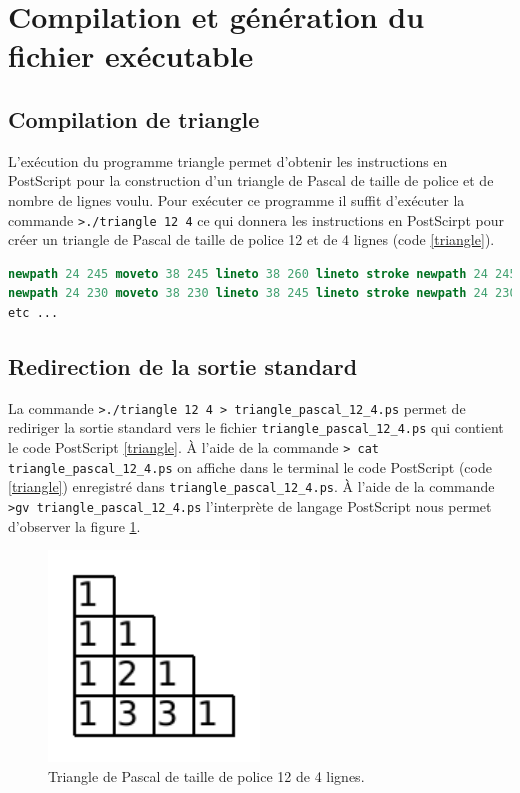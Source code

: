 \section{Compilation et génération du fichier exécutable}

\subsection{Compilation de triangle}
L'exécution du programme triangle permet d'obtenir les instructions en PostScript pour la construction d'un triangle de Pascal de taille de police et de nombre de lignes voulu.
Pour exécuter ce programme il suffit d'exécuter la commande \verb|>./triangle 12 4| ce qui donnera les instructions en PostScirpt pour créer un triangle de Pascal de taille de police 12 et de 4 lignes (code \ref{triangle}).
\begin{lstlisting}[language=PostScript, label=triangle, caption=./triangle 12 4]
newpath 24 245 moveto 38 245 lineto 38 260 lineto stroke newpath 24 245 moveto 24 260 lineto 38 260 lineto stroke /Courier findfont 12 scalefont setfont newpath 25 248 moveto (1) show 
newpath 24 230 moveto 38 230 lineto 38 245 lineto stroke newpath 24 230 moveto 24 245 lineto 38 245 lineto stroke /Courier findfont 12 scalefont setfont newpath 25 233 moveto (1) show 
etc ...
\end{lstlisting}

\subsection{Redirection de la sortie standard}
\label{sec:sortie}

La commande \verb|>./triangle 12 4 > triangle_pascal_12_4.ps| permet de rediriger la sortie standard vers le fichier \verb|triangle_pascal_12_4.ps| qui contient le code PostScript \ref{triangle}.
À l'aide de la commande \verb|> cat triangle_pascal_12_4.ps| on affiche dans le terminal le code PostScript (code \ref{triangle}) enregistré dans \verb|triangle_pascal_12_4.ps|.
À l'aide de la commande \verb|>gv triangle_pascal_12_4.ps| l'interprète de langage PostScript nous permet d'observer la figure \ref{fig:triangle_12_4}.

\begin{figure}[!h]
\begin{centering}
	\includegraphics[width=0.5\textwidth]{./images/triangle}
	\caption{Triangle de Pascal de taille de police 12 de 4 lignes.}
	\label{fig:triangle_12_4}
	\end{centering}
\end{figure}

